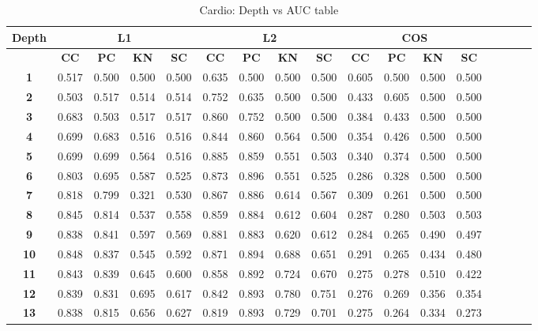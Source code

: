 \begin{table*}[!t]
\caption{Cardio: Depth vs AUC table}
\label{comparisons:cardio}
\centering
\begin{tabular}{|c|c|c|c|c|c|c|c|c|c|c|c|c|c|c|c|c|}
\hline
\bfseries Depth & \multicolumn{4}{c|}{\textbf{L1}} & \multicolumn{4}{c|}{\textbf{L2}} & \multicolumn{4}{c|}{\textbf{COS}} \\
\hline
\bfseries  & \bfseries CC & \bfseries PC & \bfseries KN & \bfseries SC & \bfseries CC & \bfseries PC & \bfseries KN & \bfseries SC & \bfseries CC & \bfseries PC & \bfseries KN & \bfseries SC \\
\hline
\bfseries 1 & 0.517 & 0.500 & 0.500 & 0.500 & 0.635 & 0.500 & 0.500 & 0.500 & 0.605 & 0.500 & 0.500 & 0.500 \\
\hline\bfseries 2 & 0.503 & 0.517 & 0.514 & 0.514 & 0.752 & 0.635 & 0.500 & 0.500 & 0.433 & 0.605 & 0.500 & 0.500 \\
\hline\bfseries 3 & 0.683 & 0.503 & 0.517 & 0.517 & 0.860 & 0.752 & 0.500 & 0.500 & 0.384 & 0.433 & 0.500 & 0.500 \\
\hline\bfseries 4 & 0.699 & 0.683 & 0.516 & 0.516 & 0.844 & 0.860 & 0.564 & 0.500 & 0.354 & 0.426 & 0.500 & 0.500 \\
\hline\bfseries 5 & 0.699 & 0.699 & 0.564 & 0.516 & 0.885 & 0.859 & 0.551 & 0.503 & 0.340 & 0.374 & 0.500 & 0.500 \\
\hline\bfseries 6 & 0.803 & 0.695 & 0.587 & 0.525 & 0.873 & 0.896 & 0.551 & 0.525 & 0.286 & 0.328 & 0.500 & 0.500 \\
\hline\bfseries 7 & 0.818 & 0.799 & 0.321 & 0.530 & 0.867 & 0.886 & 0.614 & 0.567 & 0.309 & 0.261 & 0.500 & 0.500 \\
\hline\bfseries 8 & 0.845 & 0.814 & 0.537 & 0.558 & 0.859 & 0.884 & 0.612 & 0.604 & 0.287 & 0.280 & 0.503 & 0.503 \\
\hline\bfseries 9 & 0.838 & 0.841 & 0.597 & 0.569 & 0.881 & 0.883 & 0.620 & 0.612 & 0.284 & 0.265 & 0.490 & 0.497 \\
\hline\bfseries 10 & 0.848 & 0.837 & 0.545 & 0.592 & 0.871 & 0.894 & 0.688 & 0.651 & 0.291 & 0.265 & 0.434 & 0.480 \\
\hline\bfseries 11 & 0.843 & 0.839 & 0.645 & 0.600 & 0.858 & 0.892 & 0.724 & 0.670 & 0.275 & 0.278 & 0.510 & 0.422 \\
\hline\bfseries 12 & 0.839 & 0.831 & 0.695 & 0.617 & 0.842 & 0.893 & 0.780 & 0.751 & 0.276 & 0.269 & 0.356 & 0.354 \\
\hline\bfseries 13 & 0.838 & 0.815 & 0.656 & 0.627 & 0.819 & 0.893 & 0.729 & 0.701 & 0.275 & 0.264 & 0.334 & 0.273 \\

\end{tabular}
\end{table*}
